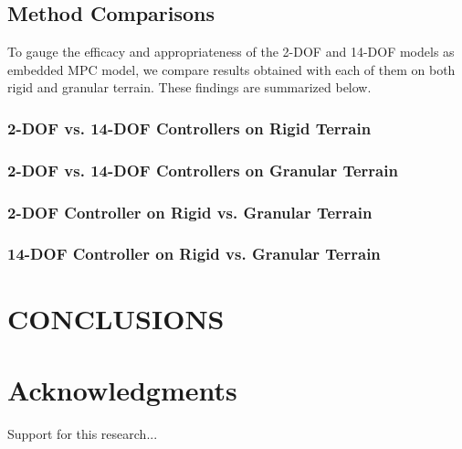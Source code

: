 \documentclass[12pt,twocolumn]{article}
\begin{document}

\subsection{Method Comparisons}\label{ss:comparisons}

To gauge the efficacy and appropriateness of the 2-DOF and 14-DOF models as embedded MPC model, we compare results obtained with each of them on both rigid and granular terrain.  These findings are summarized below.


\subsubsection{2-DOF vs. 14-DOF Controllers on Rigid Terrain }\label{sss:Comp1}


\subsubsection{2-DOF vs. 14-DOF Controllers on Granular Terrain }\label{sss:Comp2}


\subsubsection{2-DOF Controller on Rigid vs. Granular Terrain}\label{sss:Comp3}


\subsubsection{14-DOF Controller on Rigid vs. Granular Terrain }\label{sss:Comp4}


\section{CONCLUSIONS}\label{s:conclusion}



\section*{Acknowledgments}
Support for this research...





\end{document}
